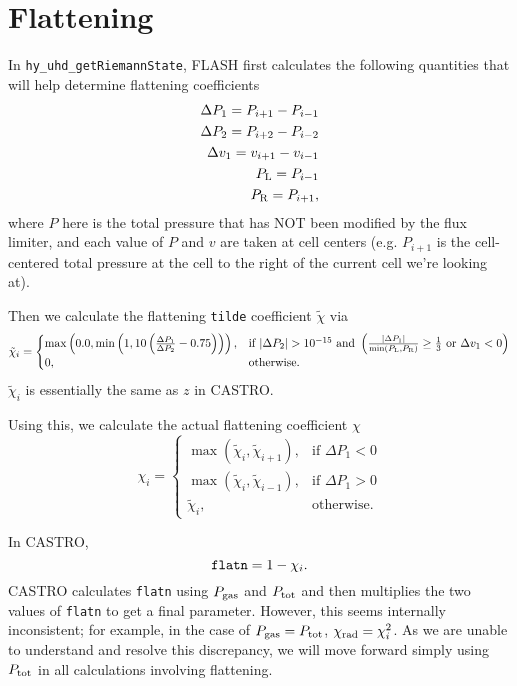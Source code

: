 \documentclass[preprint,11pt]{aastex}
\newcommand{\beq}{\begin{equation}}
\newcommand{\eeq}{\end{equation}}
\newcommand{\bea}{\begin{eqnarray}}
\newcommand{\eea}{\end{eqnarray}}
\begin{document}
\section{Flattening}
\label{sec:flattening}
In \verb!hy_uhd_getRiemannState!, FLASH first calculates the following quantities that will help determine flattening coefficients
\bea
\Delta P_1 = P_{i+1} - P_{i-1} \\
\Delta P_2 = P_{i+2} - P_{i-2} \\
\Delta v_1 = v_{i+1} - v_{i-1} \\
P_{\rm L}  = P_{i-1} \\
P_{\rm R}  = P_{i+1},
\eea
where $P$ here is the total pressure that has NOT been modified by the flux limiter, and each value of $P$ and $v$ are taken at cell centers (e.g. $P_{i+1}$ is the cell-centered total pressure at the cell to the right of the current cell we're looking at).

Then we calculate the flattening \verb!tilde! coefficient $\tilde{\chi}$ via
\[
    \tilde{\chi}_i = 
\begin{cases}
		\max\left(0.0,\min\left(1,10 \left(\frac{\Delta P_1}{\Delta P_2} - 0.75\right)\right)\right),& \text{if } |\Delta P_2| > 10^{-15} \text{ and }\left(\frac{|\Delta P_1|}{\min(P_{\rm L}, P_{\rm R})} \geq \frac{1}{3}\text{ or }\Delta v_1 < 0\right)\\
    0,              & \text{otherwise}.
\end{cases}
\]
$\tilde{\chi}_i$ is essentially the same as $z$ in CASTRO.

Using this, we calculate the actual flattening coefficient $\chi$
\[
    \chi_i = 
\begin{cases}
		\max \left( \tilde{\chi}_i,\tilde{\chi}_{i+1} \right),& \text{if } \Delta P_1 < 0 \\
		\max \left( \tilde{\chi}_i,\tilde{\chi}_{i-1} \right),& \text{if } \Delta P_1 > 0 \\
    \tilde{\chi}_i,              & \text{otherwise}.
\end{cases}
\]

In CASTRO,
\beq
\verb!flatn! = 1 - \chi_i.
\eeq
CASTRO calculates \verb!flatn! using $P_{\rm gas}$ and $P_{\rm tot}$ and then multiplies the two values of \verb!flatn! to get a final parameter.  However, this seems internally inconsistent; for example, in the case of $P_{\rm gas}=P_{\rm tot}$, $\chi_{\rm rad} = \chi_i^2$.  {\color{blue}As we are unable to understand and resolve this discrepancy, we will move forward simply using $P_{\rm tot}$ in all calculations involving flattening.}
\end{document}
